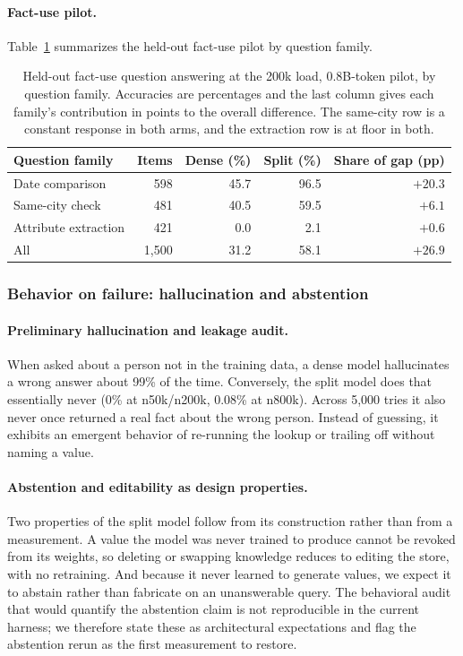 \documentclass{article}
\begin{document}
\paragraph{Fact-use pilot.}
Table~\ref{tab:pilot_factqa} summarizes the held-out fact-use pilot by question family.

\begin{table}[!htbp]
\centering
\small
\caption{Held-out fact-use question answering at the 200k load, 0.8B-token pilot, by question family. Accuracies are percentages and the last column gives each family's contribution in points to the overall difference. The same-city row is a constant response in both arms, and the extraction row is at floor in both.}
\label{tab:pilot_factqa}
\begin{tabular}{lrrrr}
\toprule Question family & Items & Dense (\%) & Split (\%) & Share of gap (pp)\\
\midrule Date comparison       & 598     & 45.7 & 96.5 & $+20.3$\\
Same-city check       & 481     & 40.5 & 59.5 & $+6.1$\\
Attribute extraction  & 421     & 0.0  & 2.1  & $+0.6$\\
\midrule All                   & 1{,}500 & 31.2 & 58.1 & $+26.9$\\
\bottomrule
\end{tabular}
\end{table}

\subsubsection{Behavior on failure: hallucination and abstention}

\paragraph{Preliminary hallucination and leakage audit.}
When asked about a person not in the training data, a dense model hallucinates a wrong answer about 99\% of the time. Conversely, the split model does that essentially never (0\% at n50k/n200k, 0.08\% at n800k). Across 5,000 tries it also never once returned a real fact about the wrong person. Instead of guessing, it exhibits an emergent behavior of re-running the lookup or trailing off without naming a value.

\paragraph{Abstention and editability as design properties.}
Two properties of the split model follow from its construction rather than from a measurement. A value the model was never trained to produce cannot be revoked from its weights, so deleting or swapping knowledge reduces to editing the store, with no retraining. And because it never learned to generate values, we expect it to abstain rather than fabricate on an unanswerable query. The behavioral audit that would quantify the abstention claim is not reproducible in the current harness; we therefore state these as architectural expectations and flag the abstention rerun as the first measurement to restore.
\end{document}
